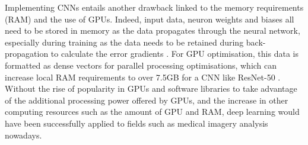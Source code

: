 Implementing CNNs entails another drawback linked to the memory requirements (RAM) and the use of GPUs. Indeed, input data, neuron weights and biases all need to be stored in memory as the data propagates through the neural network, especially during training as the data needs to be retained during back-propagation to calculate the error gradients \citep{Geron2019}. For GPU optimisation, this data is formatted as dense vectors for parallel processing optimisations, which can increase local RAM requirements to over 7.5GB for a CNN like ResNet-50 \citep{Hanlon2016}.\\

Without the rise of popularity in GPUs and software libraries to take advantage of the additional processing power offered by GPUs, and the increase in other computing resources such as the amount of GPU and RAM, deep learning would have been successfully applied to fields such as medical imagery analysis nowadays.
